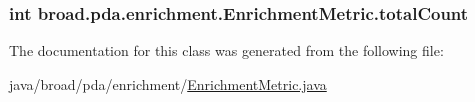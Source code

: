 \hypertarget{classbroad_1_1pda_1_1enrichment_1_1_enrichment_metric_a515f9f05d5b7b46acaefeb8433f9fe4c}{
\subsubsection[{total\+Count}]{\setlength{\rightskip}{0pt plus 5cm}int broad.\+pda.\+enrichment.\+Enrichment\+Metric.\+total\+Count\hspace{0.3cm}{\ttfamily [protected]}}}\label{classbroad_1_1pda_1_1enrichment_1_1_enrichment_metric_a515f9f05d5b7b46acaefeb8433f9fe4c}


The documentation for this class was generated from the following file\+:\begin{DoxyCompactItemize}
\item 
java/broad/pda/enrichment/\hyperlink{_enrichment_metric_8java}{Enrichment\+Metric.\+java}\end{DoxyCompactItemize}
